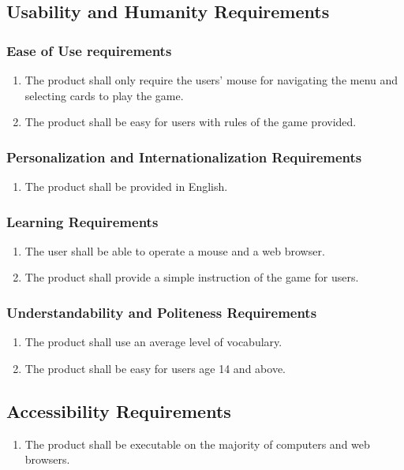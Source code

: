 \documentclass[12pt, titlepage]{article}
\begin{document}
\subsection{Usability and Humanity Requirements}
\subsubsection{Ease of Use requirements}
\begin{enumerate}
    \item The product shall only require the users' mouse for navigating the menu and selecting cards to play the game.
    \item The product shall be easy for users with rules of the game provided.
\end{enumerate}

\subsubsection{Personalization and Internationalization Requirements}
\begin{enumerate}
    \item The product shall be provided in English.
\end{enumerate}

\subsubsection{Learning Requirements}
\begin{enumerate}
    \item The user shall be able to operate a mouse and a web browser.
    \item The product shall provide a simple instruction of the game for users.
\end{enumerate}

\subsubsection{Understandability and Politeness Requirements}
\begin{enumerate}
    \item The product shall use an average level of vocabulary.
    \item The product shall be easy for users age 14 and above.
\end{enumerate}

\subsection{Accessibility Requirements}
\begin{enumerate}
    \item The product shall be executable on the majority of computers and web browsers.
\end{enumerate}
\end{document}
